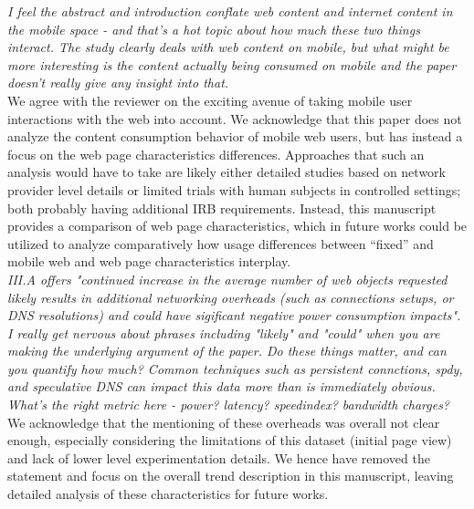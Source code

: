 \documentclass[11pt, draftclsnofoot, onecolumn]{IEEEtran}
\begin{document}
{{\noindent \textit{I feel the abstract and introduction conflate web content and internet content in the mobile space - and that's a hot topic about how much these two things interact. The study clearly deals with web content on mobile, but what might be more interesting is the content actually being consumed on mobile and the paper doesn't really give any insight into that.}\\
We agree with the reviewer on the exciting avenue of taking mobile user interactions with the web into account.
We acknowledge that this paper does not analyze the content consumption behavior of mobile web users, but has instead a focus on the web page characteristics differences. Approaches that such an analysis would have to take are likely either detailed studies based on network provider level details or limited trials with human subjects in controlled settings; both probably having additional IRB requirements. 
Instead, this manuscript provides a comparison of web page characteristics, which in future works could be utilized to analyze comparatively how usage differences between ``fixed'' and mobile web and web page characteristics interplay.
\\

\noindent \textit{III.A offers "continued increase in the average number of web objects requested likely results in additional networking overheads (such as connections setups, or DNS resolutions) and could have sigificant negative power consumption impacts". I really get nervous about phrases including "likely" and "could" when you are making the underlying argument of the paper. Do these things matter, and can you quantify how much? Common techniques such as persistent connctions, spdy, and speculative DNS can impact this data more than is immediately obvious. What's the right metric here - power? latency? speedindex? bandwidth charges?}\\
We acknowledge that the mentioning of these overheads was overall not clear enough, especially considering the limitations of this dataset (initial page view) and lack of lower level experimentation details. We hence have removed the statement and focus on the overall trend description in this manuscript, leaving detailed analysis of these characteristics for future works.\\


}}
\end{document}
